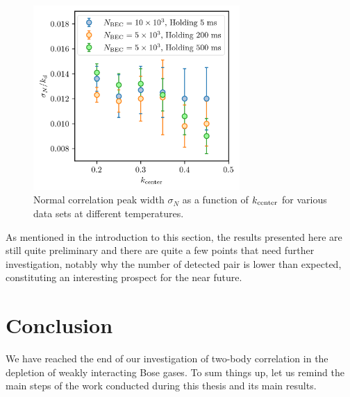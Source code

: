 \begin{figure}
    \centering
    \includegraphics[width=0.7\textwidth]{Fig/Chapter4/sigma_N_vs_k.png}
    \caption[Evolution of the normal correlation peak width $\sigma_N$ with $k$]{Normal correlation peak width $\sigma_N$ as a function of $k_{\rm{center}}$ for various data sets at different temperatures.}
    \label{fig:sigma_N_vs_k}
\end{figure}

As mentioned in the introduction to this section, the results presented here are still quite preliminary and there are quite a few points that need further investigation, notably why the number of detected pair is lower than expected, constituting an interesting prospect for the near future.

\section{Conclusion}

We have reached the end of our investigation of two-body correlation in the depletion of weakly interacting Bose gases. To sum things up, let us remind the main steps of the work conducted during this thesis and its main results.

